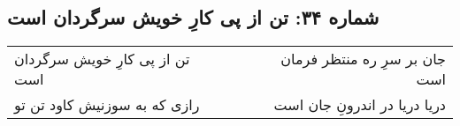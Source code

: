 \begin{center}
\section*{شماره ۳۴: تن از پی کارِ خویش سرگردان است}
\label{sec:034}
\begin{longtable}{l p{0.5cm} r}
تن از پی کارِ خویش سرگردان است
&&
جان بر سرِ ره منتظر فرمان است
\\
رازی که به سوزنیش کاود تن تو
&&
دریا دریا در اندرونِ جان است
\\
\end{longtable}
\end{center}
